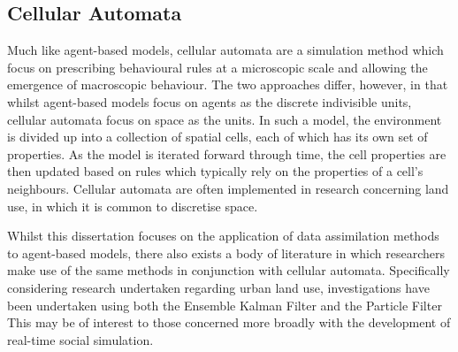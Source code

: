 



\subsection{Cellular Automata}\label{sub:lit_rev:ca}

Much like agent-based models, cellular automata are a simulation method which
focus on prescribing behavioural rules at a microscopic scale and allowing the
emergence of macroscopic behaviour.
The two approaches differ, however, in that whilst agent-based models focus on
agents as the discrete indivisible units, cellular automata focus on space as
the units.
In such a model, the environment is divided up into a collection of spatial
cells, each of which has its own set of properties.
As the model is iterated forward through time, the cell properties are then
updated based on rules which typically rely on the properties of a cell's
neighbours.
Cellular automata are often implemented in research concerning land use, in
which it is common to discretise space.

Whilst this dissertation focuses on the application of data assimilation methods
to agent-based models, there also exists a body of literature in which
researchers make use of the same methods in conjunction with cellular automata.
Specifically considering research undertaken regarding urban land use,
investigations have been undertaken using both the Ensemble Kalman Filter
\citep{li2017exploring, zhang2011model, zhang2013urban} and the Particle Filter
\citep{verstegen2014identifying} 
This may be of interest to those concerned more broadly with the development of
real-time social simulation.


